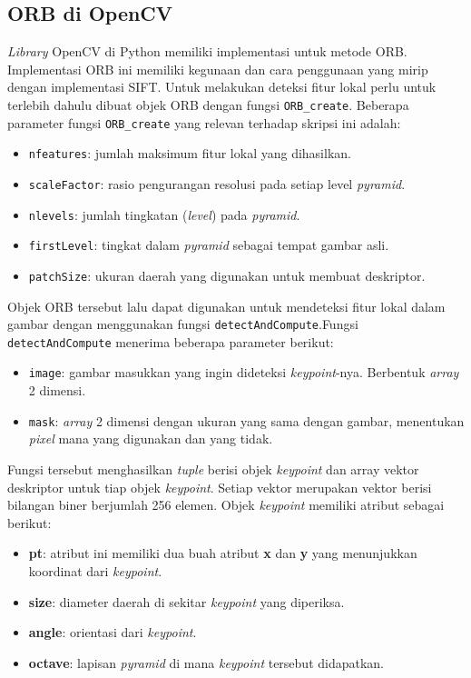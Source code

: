 \subsection{ORB di OpenCV}
\textit{Library} OpenCV di Python memiliki implementasi untuk metode ORB. Implementasi ORB ini memiliki kegunaan dan cara penggunaan yang mirip dengan implementasi SIFT. Untuk melakukan deteksi fitur lokal perlu untuk terlebih dahulu dibuat objek ORB dengan fungsi \texttt{ORB\_create}. Beberapa parameter fungsi \texttt{ORB\_create} yang relevan terhadap skripsi ini adalah:
\begin{itemize}
	\item \texttt{nfeatures}: jumlah maksimum fitur lokal yang dihasilkan.
	\item \texttt{scaleFactor}: rasio pengurangan resolusi pada setiap level \textit{pyramid}.
	\item \texttt{nlevels}: jumlah tingkatan (\textit{level}) pada \textit{pyramid}.
	\item \texttt{firstLevel}: tingkat dalam \textit{pyramid} sebagai tempat gambar asli.
	\item \texttt{patchSize}: ukuran daerah yang digunakan untuk membuat deskriptor.
\end{itemize}

Objek ORB tersebut lalu dapat digunakan untuk mendeteksi fitur lokal dalam gambar dengan menggunakan fungsi \texttt{detectAndCompute}.Fungsi \texttt{detectAndCompute} menerima beberapa parameter berikut:
\begin{itemize}
	\item \texttt{image}: gambar masukkan yang ingin dideteksi \textit{keypoint}-nya. Berbentuk \textit{array} 2 dimensi.
	\item \texttt{mask}: \textit{array} 2 dimensi dengan ukuran yang sama dengan gambar, menentukan \textit{pixel} mana yang digunakan dan yang tidak.
\end{itemize}

Fungsi tersebut menghasilkan \textit{tuple} berisi objek \textit{keypoint} dan array vektor deskriptor untuk tiap objek \textit{keypoint}. Setiap vektor merupakan vektor berisi bilangan biner berjumlah 256 elemen. Objek \textit{keypoint} memiliki atribut sebagai berikut:
\begin{itemize}
	\item \textbf{pt}: atribut ini memiliki dua buah atribut \textbf{x} dan \textbf{y} yang menunjukkan koordinat dari \textit{keypoint}.
	\item \textbf{size}: diameter daerah di sekitar \textit{keypoint} yang diperiksa.
	\item \textbf{angle}: orientasi dari \textit{keypoint}.
	\item \textbf{octave}: lapisan \textit{pyramid} di mana \textit{keypoint} tersebut didapatkan.
\end{itemize}

